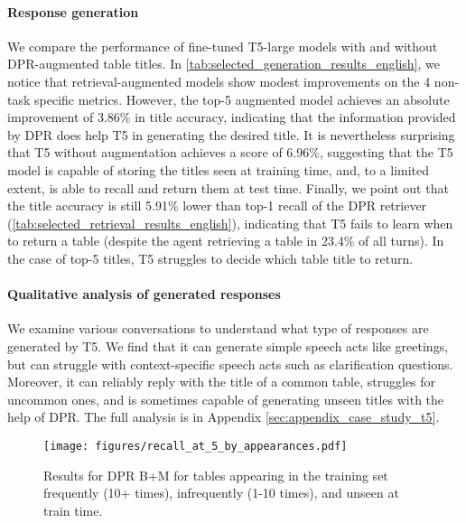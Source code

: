 \documentclass[11pt]{article}
\begin{document}
\paragraph{Response generation}
We compare the performance of fine-tuned T5-large models with and without DPR-augmented table titles.  In \autoref{tab:selected_generation_results_english}, we notice that retrieval-augmented models show modest improvements on the 4 non-task specific metrics. However, the top-5 augmented model achieves an absolute improvement of 3.86\% in title accuracy, indicating that the information provided by DPR does help T5 in generating the desired title. It is nevertheless surprising that T5 without augmentation achieves a score of 6.96\%, suggesting that the T5 model is capable of storing the titles seen at training time, and, to a limited extent, is able to recall and return them at test time. Finally, we point out that the title accuracy is still 5.91\% lower than top-1 recall of the DPR retriever (\autoref{tab:selected_retrieval_results_english}), indicating that T5 fails to learn when to return a table (despite the agent retrieving a table in 23.4\% of all turns). In the case of top-5 titles, T5 struggles to decide which table title to return.



\paragraph{Qualitative analysis of generated responses}
We examine various conversations to understand what type of responses are generated by T5. We find that it can generate simple speech acts like greetings, but can struggle with context-specific speech acts such as clarification questions. Moreover, it can reliably reply with the title of a common table, struggles for uncommon ones, and is sometimes capable of generating unseen titles with the help of DPR. The full analysis is in Appendix \ref{sec:appendix_case_study_t5}.

\begin{figure}[t]
    \small
    \centering
    \texttt{[image: figures/recall\_at\_5\_by\_appearances.pdf]}
    \caption{Results for DPR B+M for tables appearing in the training set frequently (10+ times), infrequently (1-10 times), and unseen at train time. \vspace{-3mm}}
    \label{fig:recall_at_5_by_appearances}
\end{figure}
\end{document}
